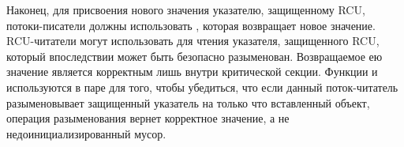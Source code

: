 Наконец, для присвоения нового значения указателю, защищенному RCU,
потоки-писатели должны использовать ,
которая возвращает новое значение.
RCU-читатели могут использовать  для чтения
указателя, защищенного RCU, который впоследствии может быть безопасно разыменован.
Возвращаемое ею значение является корректным лишь внутри критической секции.
Функции  и  используются в паре
для того, чтобы убедиться, что если данный поток-читатель разыменовывает
защищенный указатель на только что вставленный объект, операция разыменования
вернет корректное значение, а не недоинициализированный мусор.
